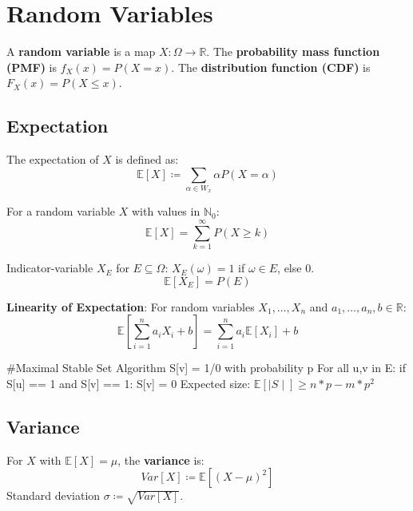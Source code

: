 \section{Random Variables}

\begin{definition}
A \textbf{random variable} is a map $X: \Omega \to \mathbb{R}$.
The \textbf{probability mass function (PMF)} is $f_X(x) = P(X=x)$.
The \textbf{distribution function (CDF)} is $F_X(x) = P(X \leq x)$.
\end{definition}

\subsection{Expectation}

\begin{definition}
The expectation of $X$ is defined as:
$$\mathbb{E}[X] \coloneqq \sum_{\alpha \in W_x} \alpha P(X=\alpha)$$
\end{definition}

\begin{theorem}
For a random variable $X$ with values in $\mathbb{N}_0$:
$$\mathbb{E}[X] = \sum_{k=1}^\infty P(X \geq k)$$
\end{theorem}

\begin{definition}
Indicator-variable $X_E$ for $E \subseteq \Omega$:
$X_E(\omega) = 1$ if $\omega \in E$, else $0$.
$$\mathbb{E}[X_E] = P(E)$$
\end{definition}

\begin{theorem}
\textbf{Linearity of Expectation}:
For random variables $X_1, \dots, X_n$ and $a_1, \dots, a_n, b \in \mathbb{R}$:
$$\mathbb{E}[\sum_{i=1}^n a_i X_i + b] = \sum_{i=1}^n a_i \mathbb{E}[X_i] + b$$
\end{theorem}

\begin{algorithm}
#Maximal Stable Set Algorithm
S[v] = 1/0 with probability p
For all {u,v} in E:
  if S[u] == 1 and S[v] == 1: S[v] = 0
Expected size: $\mathbb{E}[\mid S \mid] \geq n*p - m*p^2$
\end{algorithm}

\subsection{Variance}

\begin{definition}
For $X$ with $\mathbb{E}[X] = \mu$, the \textbf{variance} is:
$$Var[X] \coloneqq \mathbb{E}[(X-\mu)^2]$$
Standard deviation $\sigma \coloneqq \sqrt{Var[X]}$.
\end{definition}

